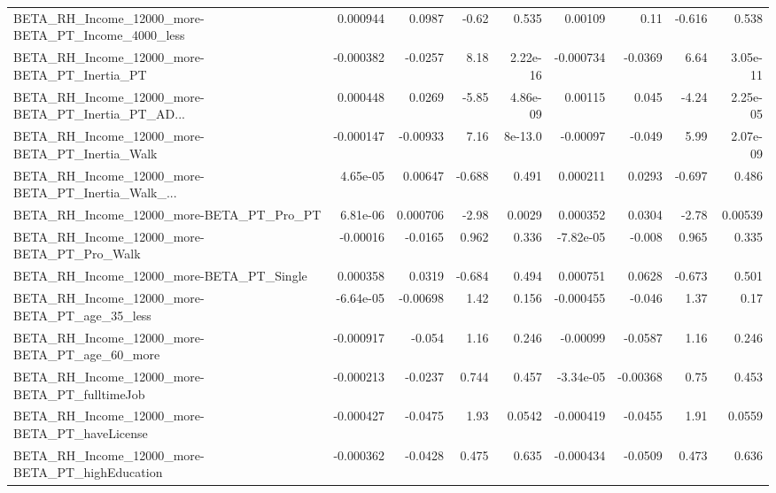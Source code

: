 \begin{tabular}{lrrrrrrrr}
BETA\_RH\_Income\_12000\_more-BETA\_PT\_Income\_4000\_less &    0.000944 &       0.0987 &    -0.62 &    0.535 &    0.00109 &        0.11 &       -0.616 &         0.538 \\
BETA\_RH\_Income\_12000\_more-BETA\_PT\_Inertia\_PT       &   -0.000382 &      -0.0257 &     8.18 & 2.22e-16 &  -0.000734 &     -0.0369 &         6.64 &      3.05e-11 \\
BETA\_RH\_Income\_12000\_more-BETA\_PT\_Inertia\_PT\_AD... &    0.000448 &       0.0269 &    -5.85 & 4.86e-09 &    0.00115 &       0.045 &        -4.24 &      2.25e-05 \\
BETA\_RH\_Income\_12000\_more-BETA\_PT\_Inertia\_Walk     &   -0.000147 &     -0.00933 &     7.16 &  8e-13.0 &   -0.00097 &      -0.049 &         5.99 &      2.07e-09 \\
BETA\_RH\_Income\_12000\_more-BETA\_PT\_Inertia\_Walk\_... &    4.65e-05 &      0.00647 &   -0.688 &    0.491 &   0.000211 &      0.0293 &       -0.697 &         0.486 \\
BETA\_RH\_Income\_12000\_more-BETA\_PT\_Pro\_PT           &    6.81e-06 &     0.000706 &    -2.98 &   0.0029 &   0.000352 &      0.0304 &        -2.78 &       0.00539 \\
BETA\_RH\_Income\_12000\_more-BETA\_PT\_Pro\_Walk         &    -0.00016 &      -0.0165 &    0.962 &    0.336 &  -7.82e-05 &      -0.008 &        0.965 &         0.335 \\
BETA\_RH\_Income\_12000\_more-BETA\_PT\_Single           &    0.000358 &       0.0319 &   -0.684 &    0.494 &   0.000751 &      0.0628 &       -0.673 &         0.501 \\
BETA\_RH\_Income\_12000\_more-BETA\_PT\_age\_35\_less      &   -6.64e-05 &     -0.00698 &     1.42 &    0.156 &  -0.000455 &      -0.046 &         1.37 &          0.17 \\
BETA\_RH\_Income\_12000\_more-BETA\_PT\_age\_60\_more      &   -0.000917 &       -0.054 &     1.16 &    0.246 &   -0.00099 &     -0.0587 &         1.16 &         0.246 \\
BETA\_RH\_Income\_12000\_more-BETA\_PT\_fulltimeJob      &   -0.000213 &      -0.0237 &    0.744 &    0.457 &  -3.34e-05 &    -0.00368 &         0.75 &         0.453 \\
BETA\_RH\_Income\_12000\_more-BETA\_PT\_haveLicense      &   -0.000427 &      -0.0475 &     1.93 &   0.0542 &  -0.000419 &     -0.0455 &         1.91 &        0.0559 \\
BETA\_RH\_Income\_12000\_more-BETA\_PT\_highEducation    &   -0.000362 &      -0.0428 &    0.475 &    0.635 &  -0.000434 &     -0.0509 &        0.473 &         0.636 \\

\end{tabular}
